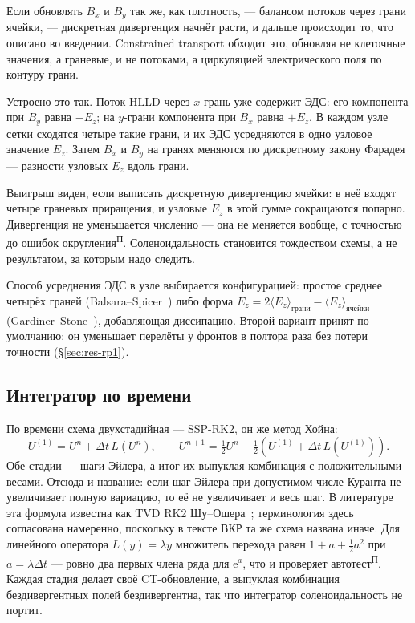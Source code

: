 \documentclass[12pt,a4paper]{article}
\newcommand{\Pv}{\textsuperscript{\scriptsize П}}   %
\begin{document}
Если обновлять $B_x$ и $B_y$ так же, как плотность, — балансом потоков через
грани ячейки, — дискретная дивергенция начнёт расти, и дальше происходит то, что
описано во введении. Constrained transport обходит это, обновляя не клеточные
значения, а граневые, и не потоками, а циркуляцией электрического поля по контуру
грани.

Устроено это так. Поток HLLD через $x$-грань уже содержит ЭДС: его компонента при
$B_y$ равна $-E_z$; на $y$-грани компонента при $B_x$ равна $+E_z$. В каждом узле
сетки сходятся четыре такие грани, и их ЭДС усредняются в одно узловое значение
$E_z$. Затем $B_x$ и $B_y$ на гранях меняются по дискретному закону Фарадея —
разности узловых $E_z$ вдоль грани.

Выигрыш виден, если выписать дискретную дивергенцию ячейки: в неё входят четыре
граневых приращения, и узловые $E_z$ в этой сумме сокращаются попарно. Дивергенция
не уменьшается численно — она не меняется вообще, с точностью до ошибок
округления\Pv. Соленоидальность становится тождеством схемы, а не результатом,
за которым надо следить.

Способ усреднения ЭДС в узле выбирается конфигурацией: простое среднее четырёх
граней (Balsara--Spicer~\cite{balsara1999}) либо форма
$E_z=2\langle E_z\rangle_{\text{грани}}-\langle E_z\rangle_{\text{ячейки}}$
(Gardiner--Stone~\cite{gardiner2005}), добавляющая диссипацию. Второй вариант
принят по умолчанию: он уменьшает перелёты у фронтов в полтора раза без потери
точности (\S\ref{sec:res-rp1}).

\subsection{Интегратор по времени}

По времени схема двухстадийная — SSP-RK2, он же метод Хойна:
\[
 U^{(1)}=U^n+\Delta t\,L(U^n),\qquad
 U^{n+1}=\tfrac12 U^n+\tfrac12\!\left(U^{(1)}+\Delta t\,L(U^{(1)})\right).
\]
Обе стадии — шаги Эйлера, а итог их выпуклая комбинация с положительными
весами. Отсюда и название: если шаг Эйлера при допустимом числе Куранта не
увеличивает полную вариацию, то её не увеличивает и весь шаг. В литературе эта
формула известна как TVD RK2 Шу--Ошера~\cite{shu1988,gottlieb2001}; терминология
здесь согласована намеренно, поскольку в тексте ВКР та же схема названа иначе.
Для линейного оператора $L(y)=\lambda y$ множитель перехода равен
$1+a+\tfrac12 a^2$ при $a=\lambda\Delta t$ — ровно два первых члена ряда для
$\mathrm e^{a}$, что и проверяет автотест\Pv. Каждая стадия делает своё
CT-обновление, а выпуклая комбинация бездивергентных полей бездивергентна, так
что интегратор соленоидальность не портит.
\end{document}
